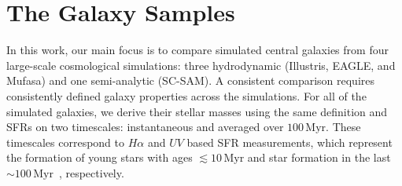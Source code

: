 \documentclass[tighten, preprint]{aastex62}
\begin{document}

\section{The Galaxy Samples} \label{sec:galsims}%
In this work, our main focus is to compare simulated central galaxies 
from four large-scale cosmological simulations: three hydrodynamic 
(Illustris, EAGLE, and {\sc Mufasa}) and one semi-analytic (SC-SAM). 
A consistent comparison requires consistently defined galaxy properties
{\color{red} across the simulations. For} all of the 
simulated galaxies, we derive their stellar masses using the same 
definition and SFRs on two timescales: instantaneous and averaged over 
$100\,\mathrm{Myr}$. These timescales correspond to $H{\alpha}$ and 
$UV$ based SFR measurements, which represent the 
formation of young stars with ages ${\lesssim}10\,\mathrm{Myr}$ 
and star formation in the last ${\sim}100\,\mathrm{Myr}$~\citep[e.g.][]{kennicutt2012}, 
respectively. 
\end{document}
